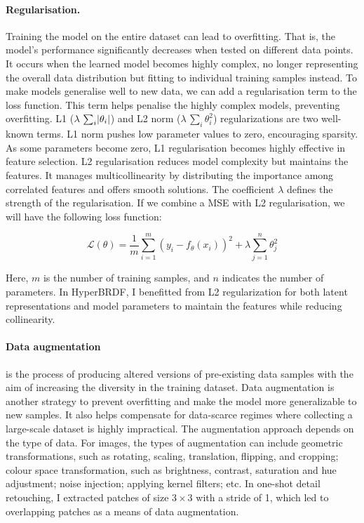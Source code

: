 \paragraph{Regularisation.} Training the model on the entire dataset can lead to overfitting. That is, the model's performance significantly decreases when tested on different data points. It occurs when the learned model becomes highly complex, no longer representing the overall data distribution but fitting to individual training samples instead. To make models generalise well to new data, we can add a regularisation term to the loss function. This term helps penalise the highly complex models, preventing overfitting. L1 ($\lambda \, \sum_i \lvert\theta_i\rvert$) and L2 norm ($\lambda \, \sum_i \theta^2_i$) regularizations are two well-known terms. L1 norm pushes low parameter values to zero, encouraging sparsity. As some parameters become zero, L1 regularisation becomes highly effective in feature selection. L2 regularisation reduces model complexity but maintains the features. It manages multicollinearity by distributing the importance among correlated features and offers smooth solutions. The coefficient $\lambda$ defines the strength of the regularisation. If we combine a MSE with L2 regularisation, we will have the following loss function:

\begin{equation}
\mathcal{L}(\theta) = \frac{1}{m} \sum_{i=1}^{m} (y_i - f_\theta(x_i))^2 + \lambda \sum_{j=1}^{n} \theta_j^2
\label{MSE-with-L2reg}
\end{equation}

Here, $m$ is the number of training samples, and $n$ indicates the number of parameters. In HyperBRDF, I benefitted from L2 regularization for both latent representations and model parameters to maintain the features while reducing collinearity.

\paragraph{Data augmentation} is the process of producing altered versions of pre-existing data samples with the aim of increasing the diversity in the training dataset. Data augmentation is another strategy to prevent overfitting and make the model more generalizable to new samples. It also helps compensate for data-scarce regimes where collecting a large-scale dataset is highly impractical. The augmentation approach depends on the type of data. For images, the types of augmentation can include geometric transformations, such as rotating, scaling, translation, flipping, and cropping; colour space transformation, such as brightness, contrast, saturation and hue adjustment; noise injection; applying kernel filters; etc. In one-shot detail retouching, I extracted patches of size $3 \times 3$ with a stride of 1, which led to overlapping patches as a means of data augmentation.

